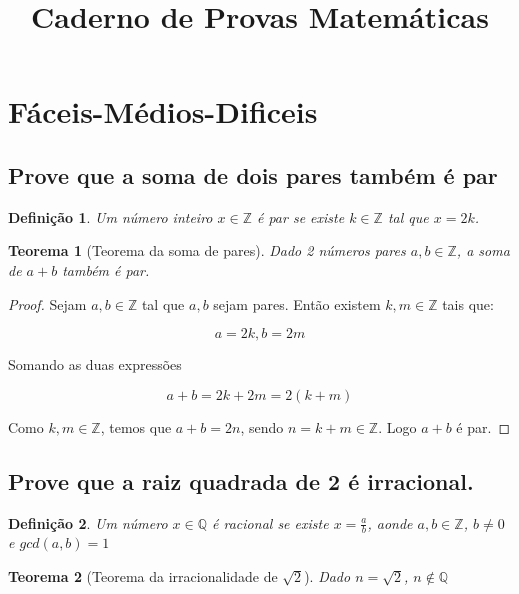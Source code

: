 \documentclass{article}
\title{Caderno de Provas Matemáticas}
\newtheorem{definition}{Definição}
\newtheorem{theorem}{Teorema}[section]
\begin{document}
\maketitle

\tableofcontents
\newpage

\section{Fáceis-Médios-Dificeis}

\subsection{Prove que a soma de dois pares também é par}

\begin{definition}
    \label{par}
    Um número inteiro $x \in \mathbb{Z}$ é par se existe $k \in \mathbb{Z}$ tal que $x = 2k$.
\end{definition}

\begin{theorem}[Teorema da soma de pares]
\label{theo:1}
Dado 2 números pares $a, b \in \mathbb{Z}$, a soma de $a + b$ também é par.
\end{theorem}

\begin{proof}
Sejam $a, b \in \mathbb{Z}$ tal que $a,b$ sejam pares. Então existem $k,m \in \mathbb{Z}$ tais que:

$$ a = 2k, b = 2m$$

Somando as duas expressões

$$
    a + b = 2k + 2m = 2(k + m)
$$

Como $k, m \in \mathbb{Z}$, temos que $a+b = 2n$, sendo $n = k + m \in \mathbb{Z}$. Logo $a+b$ é par.
\end{proof}




\subsection{Prove que a raiz quadrada de 2 é irracional.}

\begin{definition} 
    Um número $x \in \mathbb{Q}$ é racional se existe $x = \frac{a}{b}$, aonde $a,b \in \mathbb{Z}$, $b \neq 0$ e $gcd(a, b) = 1$
\end{definition}

\begin{theorem}
    [Teorema da irracionalidade de $\sqrt{2}$]
    \label{theo:2}
    Dado $n = \sqrt{2}$, $n \notin \mathbb{Q}$
\end{theorem}
\end{document}
